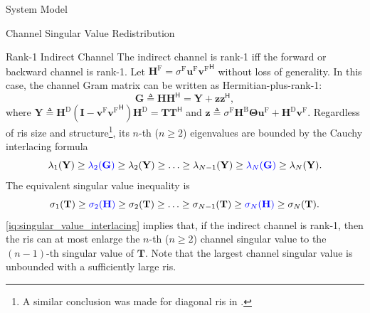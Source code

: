 \documentclass[journal]{IEEEtran}
\begin{document}
\begin{section}{System Model}
\begin{subsection}{Channel Singular Value Redistribution}
		\begin{subsubsection}{Rank-1 Indirect Channel}
			The indirect channel is rank-1 iff the forward or backward channel is rank-1.
			Let $\mathbf{H}^\mathrm{F} = \sigma^\mathrm{F} \mathbf{u}^\mathrm{F} {\mathbf{v}^\mathrm{F}}^\mathsf{H}$ without loss of generality.
			In this case, the channel Gram matrix can be written as Hermitian-plus-rank-1:
			\begin{equation}
				\mathbf{G} \triangleq \mathbf{H} \mathbf{H}^\mathsf{H} = \mathbf{Y} + \mathbf{z} \mathbf{z}^\mathsf{H},
			\end{equation}
			where $\mathbf{Y} \triangleq \mathbf{H}^\mathrm{D} (\mathbf{I} - \mathbf{v}^\mathrm{F} {\mathbf{v}^\mathrm{F}}^\mathsf{H}) \mathbf{H}^\mathrm{D} = \mathbf{T} \mathbf{T}^\mathsf{H}$ and $\mathbf{z} \triangleq \sigma^\mathrm{F} \mathbf{H}^\mathrm{B} \mathbf{\Theta} \mathbf{u}^\mathrm{F} + \mathbf{H}^\mathrm{D} \mathbf{v}^\mathrm{F}$.
			Regardless of \gls{ris} size and structure\footnote{A similar conclusion was made for diagonal \gls{ris} in \cite{Semmler2023}.}, its $n$-th ($n \ge 2$) eigenvalues are bounded by the Cauchy interlacing formula \cite{Golub2013}
			\begin{equation}
				\lambda_1(\mathbf{Y}) \ge {\color{blue}\lambda_2(\mathbf{G})} \ge \lambda_2(\mathbf{Y}) \ge \ldots \ge \lambda_{N-1}(\mathbf{Y}) \ge {\color{blue}\lambda_N(\mathbf{G})} \ge \lambda_N(\mathbf{Y}).
			\end{equation}
			The equivalent singular value inequality is
			\begin{equation}
				\sigma_1(\mathbf{T}) \ge {\color{blue}\sigma_2(\mathbf{H})} \ge \sigma_2(\mathbf{T}) \ge \ldots \ge \sigma_{N-1}(\mathbf{T}) \ge {\color{blue}\sigma_N(\mathbf{H})} \ge \sigma_N(\mathbf{T}).
				\label{iq:singular_value_interlacing}
			\end{equation}
			\eqref{iq:singular_value_interlacing} implies that, if the indirect channel is rank-1, then the \gls{ris} can at most enlarge the $n$-th ($n \ge 2$) channel singular value to the $(n-1)$-th singular value of $\mathbf{T}$.
			Note that the largest channel singular value is unbounded with a sufficiently large \gls{ris}.
		\end{subsubsection}


\end{subsection}
\end{section}
\end{document}
